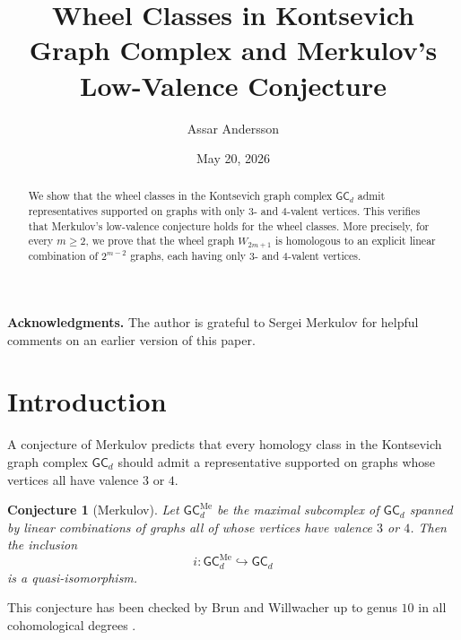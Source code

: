 \documentclass[11pt]{article}
\title{Wheel Classes in Kontsevich Graph Complex and Merkulov's Low-Valence Conjecture}
\author{Assar Andersson}
\date{May 20, 2026}
\theoremstyle{definition}
\theoremstyle{plain}
\newtheorem{conjecture}[definition]{Conjecture}
\newcommand{\GC}{\mathsf{GC}}
\begin{document}
\maketitle

\begin{abstract}
We show that the wheel classes in the Kontsevich graph complex $\GC_d$ admit representatives supported on graphs with only
$3$- and $4$-valent vertices. This verifies that Merkulov’s low-valence conjecture holds for the wheel classes.
 More precisely, for every $m \ge 2$, we prove that the wheel graph $W_{2m+1}$ is homologous to an explicit linear combination of $2^{m-2}$ graphs, each having only $3$- and $4$-valent vertices.
\end{abstract}

\medskip
\noindent\textbf{Acknowledgments.} The author is grateful to Sergei Merkulov for helpful comments on an earlier version of this paper.

\section{Introduction}
A conjecture of Merkulov predicts that every homology class in the Kontsevich graph complex $\GC_d$ should admit a representative supported on graphs whose vertices all have valence $3$ or $4$.

\begin{conjecture}[Merkulov]\label{conj:merkulov}
Let $\GC_d^{\mathrm{Me}}$ be the maximal subcomplex of $\GC_d$ spanned by linear combinations of graphs all of whose vertices have valence $3$ or $4$.
Then the inclusion
\[
i \colon \GC_d^{\mathrm{Me}}\hookrightarrow \GC_d
\]
is a quasi-isomorphism.
\end{conjecture}

This conjecture has been checked by Brun and Willwacher up to genus $10$ in all cohomological degrees \cite{BrunWillwacher2024}.
\end{document}
